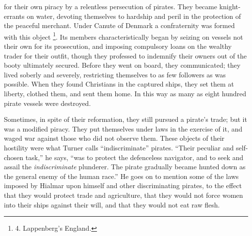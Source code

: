 for their own piracy by a relentless persecution of pirates. They
became knight-errants on water, devoting themselves to hardship and
peril in the protection of the peaceful merchant. Under Canute
of Denmark a confraternity was formed with this object \footnote{4.
Lappenberg's England.}. Its members characteristically began by seizing on vessels not
their own for its prosecution, and imposing compulsory loans on the
wealthy trader for their outfit, though they professed to indemnify
their owners out of the booty ultimately secured. Before they went on
board, they communicated; they lived soberly and severely, restricting
themselves to as few followers as was possible. When they found
Christians in the captured ships, they set them at liberty, clothed
them, and sent them home. In this way as many as eight hundred pirate
vessels were destroyed.

Sometimes, in spite of their
reformation, they still pursued a pirate's trade; but it was a
modified piracy. They put themselves under laws in the exercise of it,
and waged war against those who did not observe them. These objects of
their hostility were what Turner calls ``indiscriminate'' pirates. ``Their
peculiar and self-chosen task,'' he says, ``was to protect the
defenceless navigator, and to seek and assail the \emph{indiscriminate}
plunderer. The pirate gradually became hunted down as the general
enemy of the human race.'' He goes on to mention some of the laws
imposed by Hialmar upon himself and other discriminating pirates, to
the effect that they would protect trade and agriculture, that they
would not force women into their ships against their will, and that
they would not eat raw flesh.

